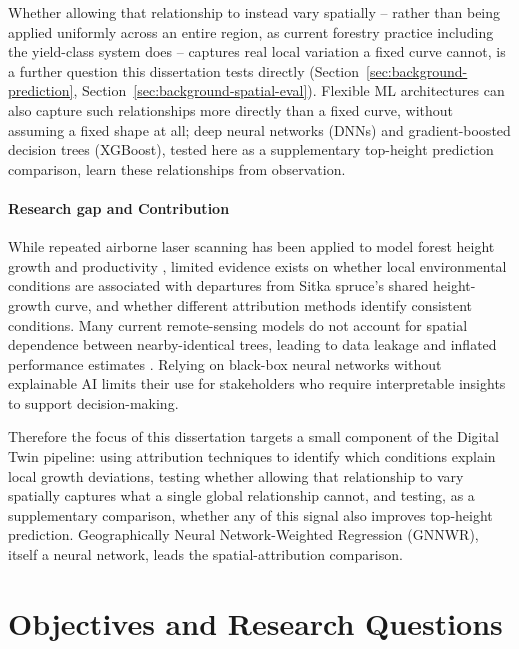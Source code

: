 \documentclass[logo,msc,ai]{infthesis}           %
\begin{document}
Whether allowing that relationship to instead vary spatially -- rather than being applied uniformly across an entire region, as current forestry practice including the yield-class system does -- captures real local variation a fixed curve cannot, is a further question this dissertation tests directly (Section~\ref{sec:background-prediction}, Section~\ref{sec:background-spatial-eval}). Flexible ML architectures can also capture such relationships more directly than a fixed curve, without assuming a fixed shape at all; deep neural networks (DNNs) and gradient-boosted decision trees (XGBoost), tested here as a supplementary top-height prediction comparison, learn these relationships from observation.

\paragraph*{Research gap and Contribution}
While repeated airborne laser scanning has been applied to model forest height growth and productivity \cite{janiec2023Development_C1_SS}, limited evidence exists on whether local environmental conditions are associated with departures from Sitka spruce's shared height-growth curve, and whether different attribution methods identify consistent conditions. Many current remote-sensing models do not account for spatial dependence between nearby-identical trees, leading to data leakage and inflated performance estimates \cite{Karasiak2022Spatial_C5_EVAL, ploton2020Spatial_C5_EVAL, lynch2025Digital_C4_NN}. Relying on black-box neural networks without explainable AI limits their use for stakeholders who require interpretable insights to support decision-making.

Therefore the focus of this dissertation targets a small component of the Digital Twin pipeline: using attribution techniques to identify which conditions explain local growth deviations, testing whether allowing that relationship to vary spatially captures what a single global relationship cannot, and testing, as a supplementary comparison, whether any of this signal also improves top-height prediction. Geographically Neural Network-Weighted Regression (GNNWR), itself a neural network, leads the spatial-attribution comparison.

\vspace{5 em}
\vspace{-0.5em}

\section{Objectives and Research Questions}
\end{document}
